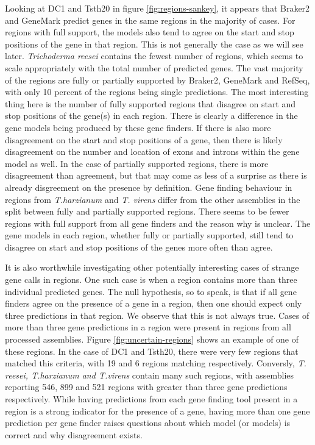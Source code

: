 Looking at DC1 and Tsth20 in figure \ref{fig:regions-sankey}, it
appears that Braker2 and GeneMark predict genes in the same regions in
the majority of cases. For regions with full support, the models also
tend to agree on the start and stop positions of the gene in that
region. This is not generally the case as we will see
later. \textit{Trichoderma reesei} contains the fewest number of
regions, which seems to scale appropriately with the total number of
predicted genes. The vast majority of the regions are fully or
partially supported by Braker2, GeneMark and RefSeq, with only 10
percent of the regions being single predictions. The most interesting
thing here is the number of fully supported regions that disagree on
start and stop positions of the gene(s) in each region. There is
clearly a difference in the gene models being produced by these gene
finders. If there is also more disagreement on the start and stop
positions of a gene, then there is likely disagreement on the number
and location of exons and introns within the gene model as well. In
the case of partially supported regions, there is more disagreement
than agreement, but that may come as less of a surprise as there is
already disgreement on the presence by definition. Gene finding
behaviour in regions from \textit{T.harzianum} and \textit{T. virens}
differ from the other assemblies in the split between fully and
partially supported regions. There seems to be fewer regions with full
support from all gene finders and the reason why is unclear. The gene
models in each region, whether fully or partially supported, still
tend to disagree on start and stop positions of the genes more often
than agree.

It is also worthwhile investigating other potentially interesting
cases of strange gene calls in regions. One such case is when a region
contains more than three individual predicted genes. The null
hypothesis, so to speak, is that if all gene finders agree on the
presence of a gene in a region, then one should expect only three
predictions in that region. We observe that this is not always
true. Cases of more than three gene predictions in a region were
present in regions from all processed assemblies. Figure
\ref{fig:uncertain-regions} shows an example of one of these
regions. In the case of DC1 and Tsth20, there were very few regions
that matched this criteria, with 19 and 6 regions matching
respectively. Conversly, \textit{T. reesei, T.harzianum and T.virens}
contain many such regions, with assemblies reporting 546, 899 and 521
regions with greater than three gene predictions respectively. While
having predictions from each gene finding tool present in a region is
a strong indicator for the presence of a gene, having more than one
gene prediction per gene finder raises questions about which model (or
models) is correct and why disagreement exists.

